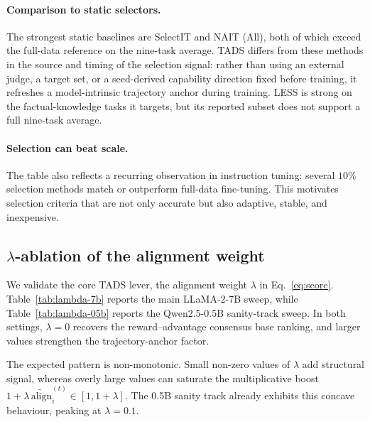 \paragraph{Comparison to static selectors.}
The strongest static baselines are SelectIT and NAIT (All), both of
which exceed the full-data reference on the nine-task average.
\textsc{TADS} differs from these methods in the source and timing of
the selection signal: rather than using an external judge, a target
set, or a seed-derived capability direction fixed before training,
it refreshes a model-intrinsic trajectory anchor during training.
LESS is strong on the factual-knowledge tasks it targets, but its
reported subset does not support a full nine-task average.

\paragraph{Selection can beat scale.}
The table also reflects a recurring observation in instruction
tuning: several $10\%$ selection methods match or outperform
full-data fine-tuning. This motivates selection criteria that are not
only accurate but also adaptive, stable, and inexpensive.

\subsection{$\lambda$-ablation of the alignment weight}
\label{sec:lambda-ablation}

We validate the core \textsc{TADS} lever, the alignment weight
$\lambda$ in Eq.~\ref{eq:score}. Table~\ref{tab:lambda-7b} reports
the main LLaMA-2-7B sweep, while Table~\ref{tab:lambda-05b} reports
the Qwen2.5-0.5B sanity-track sweep. In both settings,
$\lambda=0$ recovers the reward--advantage consensus base ranking, and
larger values strengthen the trajectory-anchor factor.

The expected pattern is non-monotonic. Small non-zero values of
$\lambda$ add structural signal, whereas overly large values can
saturate the multiplicative boost
$1+\lambda\,\widetilde{\mathrm{align}}_i^{(t)} \in [1,1+\lambda]$.
The 0.5B sanity track already exhibits this concave behaviour,
peaking at $\lambda=0.1$.

